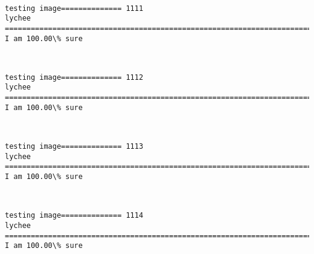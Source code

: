 \documentclass[11pt]{article}
\begin{document}
    \begin{center}
    \end{center}
    { \hspace*{\fill} \\}
    
    \begin{Verbatim}[commandchars=\\\{\}]
testing image============== 1111
lychee
============================================================================
I am 100.00\% sure

    \end{Verbatim}

    \begin{center}
    \end{center}
    { \hspace*{\fill} \\}
    
    \begin{Verbatim}[commandchars=\\\{\}]
testing image============== 1112
lychee
============================================================================
I am 100.00\% sure

    \end{Verbatim}

    \begin{center}
    \end{center}
    { \hspace*{\fill} \\}
    
    \begin{Verbatim}[commandchars=\\\{\}]
testing image============== 1113
lychee
============================================================================
I am 100.00\% sure

    \end{Verbatim}

    \begin{center}
    \end{center}
    { \hspace*{\fill} \\}
    
    \begin{Verbatim}[commandchars=\\\{\}]
testing image============== 1114
lychee
============================================================================
I am 100.00\% sure

    \end{Verbatim}
\end{document}
